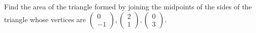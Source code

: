 Find the area of the triangle formed by joining the midpoints of the sides of the triangle whose vertices are $\begin{pmatrix}
0\\-1
\end{pmatrix}, \begin{pmatrix}
2\\1
\end{pmatrix}, \begin{pmatrix}
0\\3
\end{pmatrix}.$